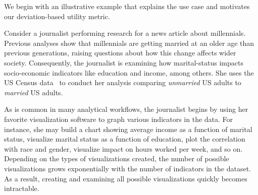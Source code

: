 We begin with an illustrative example that explains the \SeeDB use case and motivates our deviation-based
utility metric. 
\begin{example}
Consider a journalist performing research for a news article about millennials.
Previous analyses show that millennials are getting married at an older age than 
previous generations, raising questions about how this change affects
wider society.
Consequently, the journalist is examining how marital-status
impacts socio-economic indicators like education and income, among others.
She uses the US Census data~\cite{census}
to conduct her analysis comparing {\em unmarried} US adults
to {\em married} US adults.

As is common in many analytical workflows, the journalist begins by using her favorite 
visualization software to graph various indicators in the data.
For instance, she may build a chart showing average income as a function of marital status,
visualize marital status as a function of education, plot the correlation with race and gender,
visualize impact on hours worked per week, and so on.
Depending on the types of visualizations created, the number of possible 
visualizations grows exponentially with the number of indicators in the dataset.
As a result, creating and examining all possible visualizations
quickly becomes intractable.


\end{example}
